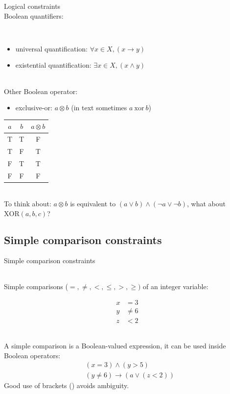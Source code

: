 \documentclass{cons-beamer}
\begin{document}
\begin{frame}{Logical constraints}
  $ $\\
  Boolean quantifiers:

  $ $\\
  \begin{itemize}
    \item universal quantification: $\forall x \in X, (x \rightarrow y)$
    \item existential quantification: $\exists x \in X, (x \wedge y)$
  \end{itemize}

  $ $\\
  Other Boolean operator:

  \begin{itemize}
    \item exclusive-or: $a \otimes b$ \quad(in text sometimes $a ~\mbox{xor}~ b$)
  \end{itemize}

  \begin{center}
    \begin{tabular}{|c|c|c|}
      \hline
      \( a \) & \( b \) & \( a \otimes b \) \\
      \hline
      T & T & F \\
      T & F & T \\
      F & T & T \\
      F & F & F \\
      \hline
    \end{tabular}
  \end{center}

  $ $\\
  To think about: $a \otimes b$ is equivalent to $(a \vee b) \wedge (\neg a \vee \neg b)$, what about $\mbox{XOR}(a,b,c)$?
\end{frame}


\subsection{Simple comparison constraints}

\begin{frame}{Simple comparison constraints}

  $ $\\
  Simple comparisons ($=, \neq, <, \leq, >, \geq)$ of an integer variable:

  \begin{align}
      x &= 3 \\
      y &\neq 6 \\
      z & < 2
  \end{align}

  $ $\\
  A simple comparison is a Boolean-valued expression, it can be used inside Boolean operators:
  \begin{align}
      &(x = 3) \wedge (y > 5) \\
      &(y \neq 6) \rightarrow (a \vee (z < 2))
  \end{align}
  Good use of brackets () avoids ambiguity.
\end{frame}
\end{document}
